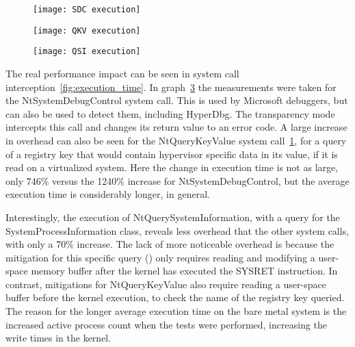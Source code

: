 \begin{figure*}[th]
    \begin{subfigure}[t]{\threecolgrid}
        \texttt{[image: SDC execution]}
        \sfigcap{}\label{fig:exec-time-a}
    \end{subfigure}
    \begin{subfigure}[t]{\threecolgrid}
        \texttt{[image: QKV execution]}
        \sfigcap{}\label{fig:exec-time-b}
    \end{subfigure}
    \begin{subfigure}[t]{\threecolgrid}
        \texttt{[image: QSI execution]}
        \sfigcap{}\label{fig:exec-time-c}
    \end{subfigure}
    \label{fig:execution_time}
\end{figure*}

The real performance impact can be seen in system call interception~\ref{fig:execution_time}. In graph~\ref{fig:exec-time-c} 
the measurements were taken for the NtSystemDebugControl system call. 
This is used by Microsoft debuggers, but can also be used to detect them, including HyperDbg. The transparency mode intercepts this call 
and changes its return value to an error code. A large increase in overhead can also be seen for the NtQueryKeyValue system call~\ref{fig:exec-time-a}, 
for a query of a registry key that would contain hypervisor specific data in its value, if it is read on a virtualized system.
Here the change in execution time is not as large, only 746\% versus the 1240\% increase for NtSystemDebugControl, but the average execution time is considerably longer, in general.

Interestingly, the execution of NtQuerySystemInformation, with a query for the SystemProcessInformation class, reveals less overhead that the other system calls, 
with only a 70\% increase. The lack of more noticeable overhead is because the mitigation for this specific query () 
only requires reading and modifying a user-space memory buffer after the kernel has executed the SYSRET instruction. In contrast, mitigations for NtQueryKeyValue 
also require reading a user-space buffer before the kernel execution, to check the name of the registry key queried. 
The reason for the longer average execution time on the bare metal system is the increased active process count when the tests were performed, increasing the write times in the kernel.

